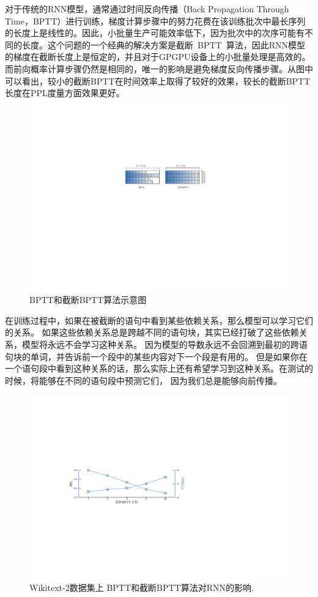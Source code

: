 对于传统的RNN模型，通常通过时间反向传播（Back Propagation Through Time，BPTT）进行训练，梯度计算步骤中的努力花费在该训练批次中最长序列的长度上是线性的。因此，小批量生产可能效率低下，因为批次中的次序可能有不同的长度。这个问题的一个经典的解决方案是截断~BPTT~算法，因此RNN模型的梯度在截断长度上是恒定的，并且对于GPGPU设备上的小批量处理是高效的。而前向概率计算步骤仍然是相同的，唯一的影响是避免梯度反向传播步骤。从图中可以看出，较小的截断BPTT在时间效率上取得了较好的效果，较长的截断BPTT长度在PPL度量方面效果更好。
\begin{figure}[!ht]
  \centering
  \includegraphics[width=.8\columnwidth]{./figures/minibatch.pdf}
  \caption{BPTT和截断BPTT算法示意图}\label{fig:minibatch}
\end{figure}

在训练过程中，如果在被截断的语句中看到某些依赖关系，那么模型可以学习它们的关系。 如果这些依赖关系总是跨越不同的语句块，其实已经打破了这些依赖关系，模型将永远不会学习这种关系。 因为模型的导数永远不会回溯到最初的跨语句块的单词，并告诉前一个段中的某些内容对下一个段是有用的。 但是如果你在一个语句段中看到这种关系的话，那么实际上还有希望学习到这种关系。在测试的时候，将能够在不同的语句段中预测它们， 因为我们总是能够向前传播。
\begin{figure}[!ht]
  \centering
  \includegraphics[width=.85\columnwidth]{./figures/tbptt.pdf}
  \caption{Wikitext-2数据集上 BPTT和截断BPTT算法对RNN的影响.}\label{fig:tbptt}
\end{figure}
